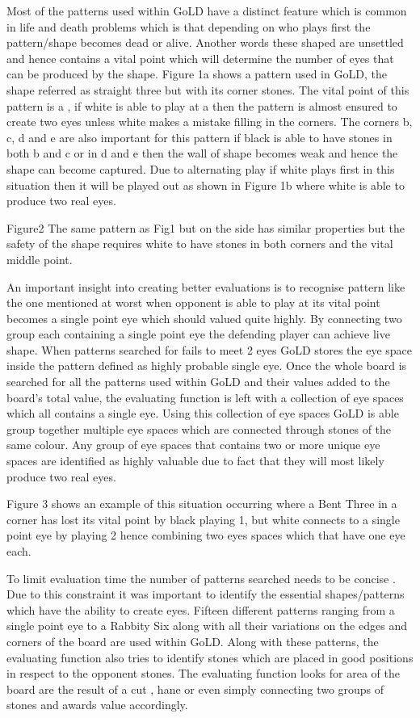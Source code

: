 \documentclass{l4proj}
\begin{document}
Most of the patterns used within GoLD have a distinct feature which is common in life and death problems which is that depending on who plays first the pattern/shape becomes dead or alive. Another words these shaped are unsettled and hence contains a vital point which will determine the number of eyes that can be produced by the shape. Figure 1a shows a pattern used in GoLD, the shape referred as straight three but with its corner stones. The vital point of this pattern is a , if white is able to play at a then the pattern is almost ensured to create two eyes unless white makes a mistake filling in the corners. The corners b, c, d and e are also important for this pattern if black is able to have stones in both b and c  or in d and e then the wall of shape becomes weak and hence the shape can become captured. Due to alternating play if white plays first in this situation then it will be played out as shown in Figure 1b where white is able to produce two real eyes.


Figure2
The same pattern as Fig1 but on the side has similar properties but the safety of the shape requires white to have stones in both corners and the vital middle point.


An important insight into creating better evaluations is to recognise pattern like the one mentioned at worst when opponent is able to play at its vital point becomes a single point eye which should valued quite highly. By connecting two group each containing a single point eye the defending player can achieve live shape. When patterns searched for fails to meet 2 eyes GoLD stores the eye space inside the pattern defined as highly probable single eye. Once the whole board is searched for all the patterns used within GoLD and their values added to the board’s total value, the evaluating function is left with a collection of eye spaces which all contains a single eye. Using this collection of eye spaces GoLD is able  group together multiple eye spaces which are connected through stones of the same colour. Any group of eye spaces that contains two or more unique eye spaces are identified as highly valuable due to fact that they will most likely produce two real eyes.

Figure 3 shows an example of this situation occurring where a Bent Three in a corner has lost its vital point by black playing 1, but white connects to a single point eye by playing 2 hence combining two eyes spaces which that have one eye each.

To limit evaluation time the number of patterns searched needs to be concise . Due to this constraint it was important to identify the essential shapes/patterns which have the ability to create eyes. Fifteen different patterns ranging from a single point eye to a Rabbity Six along with all their variations on the edges and corners of the board are used within GoLD.  Along with these patterns, the evaluating function also tries to identify stones which are placed in good positions in respect to the opponent stones. The evaluating function looks for area of the board are the result of a cut , hane or even simply connecting two groups of stones and awards value accordingly.
\end{document}
